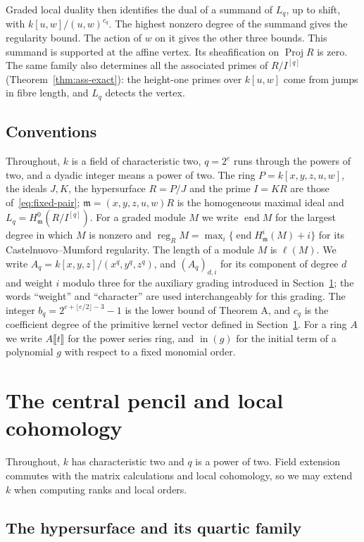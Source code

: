 \documentclass[11pt,a4paper,reqno]{amsart}
\numberwithin{equation}{section}
\theoremstyle{plain}
\theoremstyle{definition}
\theoremstyle{remark}
\newcommand{\mm}{\mathfrak m}
\newcommand{\length}{\ell}
\DeclareMathOperator{\End}{end}
\DeclareMathOperator{\ini}{in}
\DeclareMathOperator{\Proj}{Proj}
\DeclareMathOperator{\reg}{reg}
\begin{document}
Graded local duality then identifies the dual of a summand of $L_q$,
up to shift, with $k[u,w]/(u,w)^{c_q}$. The highest nonzero degree of the summand gives the regularity bound.
The action of $w$ on it gives the other three bounds.
This summand is supported at the affine vertex. Its sheafification
on $\Proj R$ is zero. The same family also determines all the associated
primes of $R/I^{[q]}$ (Theorem~\ref{thm:ass-exact}): the height-one
primes over $k[u,w]$ come from jumps in fibre length, and $L_q$
detects the vertex.

\subsection*{Conventions}
Throughout, $k$ is a field of characteristic two, $q=2^e$ runs
through the powers of two, and a dyadic integer means a power of
two. The ring $P=k[x,y,z,u,w]$, the ideals $J,K$, the hypersurface
$R=P/J$ and the prime $I=KR$ are those of~\eqref{eq:fixed-pair};
$\mm=(x,y,z,u,w)R$ is the homogeneous maximal ideal and
$L_q=H^0_{\mm}(R/I^{[q]})$. For a graded module $M$ we write
$\End M$ for the largest degree in which $M$ is nonzero and
$\reg_R M=\max_i\{\End H^i_{\mm}(M)+i\}$ for its Castelnuovo--Mumford
regularity. The length of a module $M$ is $\length(M)$. We write
$A_q=k[x,y,z]/(x^q,y^q,z^q)$, and $(A_q)_{d,i}$ for its component of
degree $d$ and weight $i$ modulo three for the auxiliary grading
introduced in Section~\ref{sec:pencil}; the words ``weight'' and
``character'' are used interchangeably for this grading. The integer
$b_q=2^{e+\lfloor e/2\rfloor-3}-1$ is the lower bound of Theorem A,
and $c_q$ is the coefficient degree of the primitive kernel vector
defined in Section~\ref{sec:pencil}. For a ring $A$ we write
$A\llbracket t\rrbracket$ for the power series ring, and $\ini(g)$
for the initial term of a polynomial $g$ with respect to a fixed
monomial order.


\section{The central pencil and local cohomology}\label{sec:pencil}
Throughout, $k$ has characteristic two and $q$ is a power of two.
Field extension commutes with the matrix calculations and local
cohomology, so we may extend $k$ when computing ranks and local orders.

\subsection{The hypersurface and its quartic family}\label{subsec:transverse}
\end{document}
